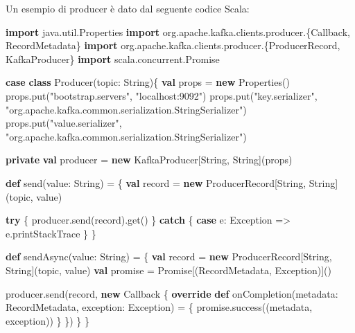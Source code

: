 \documentclass[]{article}
\newenvironment{Shaded}{}{}
\newcommand{\KeywordTok}[1]{\textcolor[rgb]{0.00,0.44,0.13}{\textbf{#1}}}
\newcommand{\StringTok}[1]{\textcolor[rgb]{0.25,0.44,0.63}{#1}}
\newcommand{\FunctionTok}[1]{\textcolor[rgb]{0.02,0.16,0.49}{#1}}
\newcommand{\NormalTok}[1]{#1}
\begin{document}
Un esempio di producer è dato dal seguente codice Scala:

\small

\begin{Shaded}
\begin{Highlighting}[]
\KeywordTok{import}\NormalTok{ java.}\FunctionTok{util}\NormalTok{.}\FunctionTok{Properties}
\KeywordTok{import}\NormalTok{ org.}\FunctionTok{apache}\NormalTok{.}\FunctionTok{kafka}\NormalTok{.}\FunctionTok{clients}\NormalTok{.}\FunctionTok{producer}\NormalTok{.\{Callback, RecordMetadata\}}
\KeywordTok{import}\NormalTok{ org.}\FunctionTok{apache}\NormalTok{.}\FunctionTok{kafka}\NormalTok{.}\FunctionTok{clients}\NormalTok{.}\FunctionTok{producer}\NormalTok{.\{ProducerRecord, KafkaProducer\}}
\KeywordTok{import}\NormalTok{ scala.}\FunctionTok{concurrent}\NormalTok{.}\FunctionTok{Promise}

\KeywordTok{case} \KeywordTok{class} \FunctionTok{Producer}\NormalTok{(topic: String)\{}
    \KeywordTok{val}\NormalTok{ props = }\KeywordTok{new}\NormalTok{ Properties()}
\NormalTok{    props.}\FunctionTok{put}\NormalTok{(}\StringTok{"bootstrap.servers"}\NormalTok{, }\StringTok{"localhost:9092"}\NormalTok{)}
\NormalTok{    props.}\FunctionTok{put}\NormalTok{(}\StringTok{"key.serializer"}\NormalTok{,}
        \StringTok{"org.apache.kafka.common.serialization.StringSerializer"}\NormalTok{)}
\NormalTok{    props.}\FunctionTok{put}\NormalTok{(}\StringTok{"value.serializer"}\NormalTok{,}
        \StringTok{"org.apache.kafka.common.serialization.StringSerializer"}\NormalTok{)}

    \KeywordTok{private} \KeywordTok{val}\NormalTok{ producer = }\KeywordTok{new}\NormalTok{ KafkaProducer[String, String](props)}

    \KeywordTok{def} \FunctionTok{send}\NormalTok{(value: String) = \{}
      \KeywordTok{val}\NormalTok{ record = }\KeywordTok{new}\NormalTok{ ProducerRecord[String, String](topic, value)}

      \KeywordTok{try}\NormalTok{ \{}
\NormalTok{        producer.}\FunctionTok{send}\NormalTok{(record).}\FunctionTok{get}\NormalTok{()}
\NormalTok{      \} }\KeywordTok{catch}\NormalTok{ \{}
        \KeywordTok{case}\NormalTok{ e: Exception => e.}\FunctionTok{printStackTrace}
\NormalTok{      \}}
\NormalTok{    \}}

    \KeywordTok{def} \FunctionTok{sendAsync}\NormalTok{(value: String) = \{}
        \KeywordTok{val}\NormalTok{ record = }\KeywordTok{new}\NormalTok{ ProducerRecord[String, String](topic, value)}
        \KeywordTok{val}\NormalTok{ promise = Promise[(RecordMetadata, Exception)]()}

\NormalTok{        producer.}\FunctionTok{send}\NormalTok{(record, }\KeywordTok{new}\NormalTok{ Callback \{}
            \KeywordTok{override} \KeywordTok{def} \FunctionTok{onCompletion}\NormalTok{(metadata: RecordMetadata,}
\NormalTok{                                      exception: Exception) = \{}
\NormalTok{                promise.}\FunctionTok{success}\NormalTok{((metadata, exception))}
\NormalTok{            \}}
\NormalTok{        \})}
\NormalTok{    \}}
\NormalTok{\}}
\end{Highlighting}
\end{Shaded}
\end{document}
